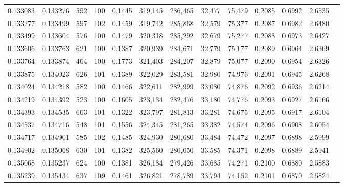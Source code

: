 \begin{tabular}{rrrrrrrrrrrrr}
0.133083 & 0.133276 &   592 & 100 &                                     0.1445 & 319,145 & 286,465 &  32,477 &  75,479 & 0.2085 & 0.6992 & 2.6535 \\
0.133277 & 0.133499 &   597 & 102 &                                     0.1459 & 319,742 & 285,868 &  32,579 &  75,377 & 0.2087 & 0.6982 & 2.6480 \\
0.133499 & 0.133604 &   576 & 100 &                                     0.1479 & 320,318 & 285,292 &  32,679 &  75,277 & 0.2088 & 0.6973 & 2.6427 \\
0.133606 & 0.133763 &   621 & 100 &                                     0.1387 & 320,939 & 284,671 &  32,779 &  75,177 & 0.2089 & 0.6964 & 2.6369 \\
0.133764 & 0.133874 &   464 & 100 &                                     0.1773 & 321,403 & 284,207 &  32,879 &  75,077 & 0.2090 & 0.6954 & 2.6326 \\
0.133875 & 0.134023 &   626 & 101 &                                     0.1389 & 322,029 & 283,581 &  32,980 &  74,976 & 0.2091 & 0.6945 & 2.6268 \\
0.134024 & 0.134218 &   582 & 100 &                                     0.1466 & 322,611 & 282,999 &  33,080 &  74,876 & 0.2092 & 0.6936 & 2.6214 \\
0.134219 & 0.134392 &   523 & 100 &                                     0.1605 & 323,134 & 282,476 &  33,180 &  74,776 & 0.2093 & 0.6927 & 2.6166 \\
0.134393 & 0.134535 &   663 & 101 &                                     0.1322 & 323,797 & 281,813 &  33,281 &  74,675 & 0.2095 & 0.6917 & 2.6104 \\
0.134537 & 0.134716 &   548 & 101 &                                     0.1556 & 324,345 & 281,265 &  33,382 &  74,574 & 0.2096 & 0.6908 & 2.6054 \\
0.134717 & 0.134901 &   585 & 102 &                                     0.1485 & 324,930 & 280,680 &  33,484 &  74,472 & 0.2097 & 0.6898 & 2.5999 \\
0.134902 & 0.135068 &   630 & 101 &                                     0.1382 & 325,560 & 280,050 &  33,585 &  74,371 & 0.2098 & 0.6889 & 2.5941 \\
0.135068 & 0.135237 &   624 & 100 &                                     0.1381 & 326,184 & 279,426 &  33,685 &  74,271 & 0.2100 & 0.6880 & 2.5883 \\
0.135239 & 0.135434 &   637 & 109 &                                     0.1461 & 326,821 & 278,789 &  33,794 &  74,162 & 0.2101 & 0.6870 & 2.5824 \\

\end{tabular}

